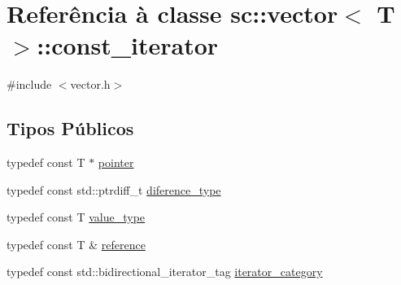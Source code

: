 \hypertarget{classsc_1_1vector_1_1const__iterator}{}\section{Referência à classe sc\+:\+:vector$<$ T $>$\+:\+:const\+\_\+iterator}
\label{classsc_1_1vector_1_1const__iterator}


{\ttfamily \#include $<$vector.\+h$>$}

\subsection*{Tipos Públicos}
\begin{DoxyCompactItemize}
\item 
typedef const T $\ast$ \mbox{\hyperlink{classsc_1_1vector_1_1const__iterator_a8548fb2f328af0cee731c77f7ca9c9a3}{pointer}}
\item 
typedef const std\+::ptrdiff\+\_\+t \mbox{\hyperlink{classsc_1_1vector_1_1const__iterator_ad232a0c43ebe4c40068c1bd538dc818c}{diference\+\_\+type}}
\item 
typedef const T \mbox{\hyperlink{classsc_1_1vector_1_1const__iterator_a85871595aa6ab1463586462be441d5b8}{value\+\_\+type}}
\item 
typedef const T \& \mbox{\hyperlink{classsc_1_1vector_1_1const__iterator_a750fedbe98f230fe9bf520117730485b}{reference}}
\item 
typedef const std\+::bidirectional\+\_\+iterator\+\_\+tag \mbox{\hyperlink{classsc_1_1vector_1_1const__iterator_ae949cc3e49289e4d69bcc20d2d6dca33}{iterator\+\_\+category}}
\end{DoxyCompactItemize}
